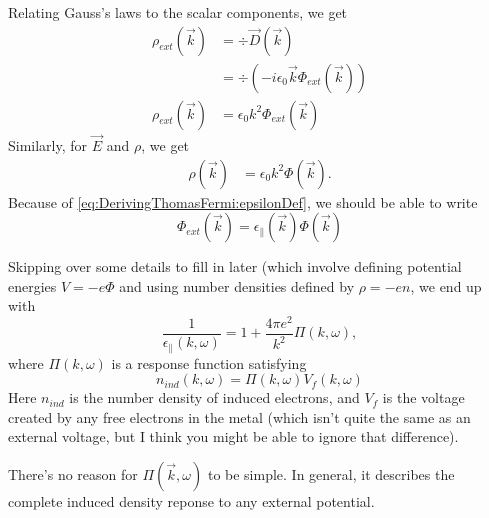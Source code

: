 \documentclass[../../main.tex]{subfiles}
\begin{document}
Relating Gauss's laws to the scalar components, we get 
\begin{align}
	\rho_{ext}(\vec{k}) &= \div{\vec{D}(\vec{k})} \\
	&= \div(- i \epsilon_0 \vec{k} \Phi_{ext}(\vec{k})) \\
	\rho_{ext}(\vec{k}) &= \epsilon_0 k^2 \Phi_{ext}(\vec{k})
\end{align}
Similarly, for $\vec{E}$ and $\rho$, we get 
\begin{align}
	\rho(\vec{k}) &= \epsilon_0 k^2 \Phi(\vec{k}).
\end{align}
Because of \eqref{eq:DerivingThomasFermi:epsilonDef}, we should be able to write 
\begin{equation}
	\Phi_{ext}(\vec{k}) = \epsilon_{\parallel}(\vec{k}) \Phi(\vec{k})
\end{equation}

Skipping over some details to fill in later (which involve defining potential energies $V = -e \Phi$ and using number densities defined by $\rho = -e n$, we end up with
\begin{equation}
	\frac{1}{\epsilon_{\parallel}(k, \omega)} = 1 + \frac{4\pi e^2}{k^2} \Pi(k, \omega),
\end{equation}
where $\Pi(k, \omega)$ is a response function satisfying
\begin{equation}
	n_{ind}(k, \omega) = \Pi(k, \omega) V_f(k, \omega)
\end{equation}
Here $n_{ind}$ is the number density of induced electrons, and $V_f$ is the voltage created by any free electrons in the metal (which isn't quite the same as an external voltage, but I think you might be able to ignore that difference).

There's no reason for $\Pi(\vec{k}, \omega)$ to be simple. In general, it describes the complete induced density reponse to any external potential.
\end{document}
